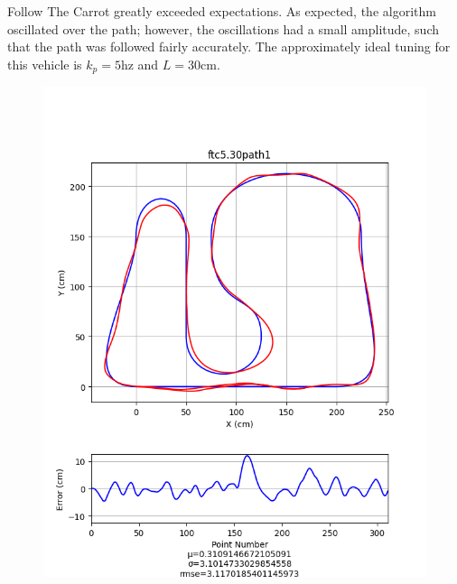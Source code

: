 \documentclass[mla7]{mla}
\begin{document}
\begin{paper}
Follow The Carrot greatly exceeded expectations. As expected, the algorithm oscillated over the path; however, the oscillations had a small amplitude, such that the path was followed fairly accurately. The approximately ideal tuning for this vehicle is $k_p=5$hz and $L=30$cm.
\begin{figure}[H]
\includegraphics[width=\linewidth]{pathData/ftcpath1}
\endminipage\hfill
{}

\end{figure}
\end{paper}
\end{document}
